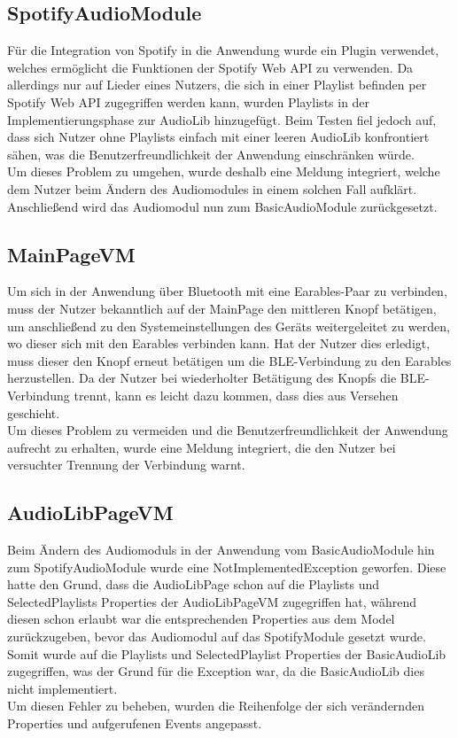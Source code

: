 \documentclass[../validierung.tex]{subfiles}
\begin{document}
	\subsection{SpotifyAudioModule}
		Für die Integration von Spotify in die Anwendung wurde ein Plugin verwendet, welches ermöglicht die Funktionen der Spotify Web API zu verwenden.
		Da allerdings nur auf Lieder eines Nutzers, die sich in einer Playlist befinden per Spotify Web API zugegriffen werden kann, wurden Playlists in
		der Implementierungsphase zur AudioLib hinzugefügt. Beim Testen fiel jedoch auf, dass sich Nutzer ohne Playlists einfach mit einer leeren AudioLib
		konfrontiert sähen, was die Benutzerfreundlichkeit der Anwendung einschränken würde.\\ Um dieses Problem zu umgehen, wurde deshalb eine Meldung
		integriert, welche dem Nutzer beim Ändern des Audiomodules in einem solchen Fall aufklärt. Anschließend wird das Audiomodul nun zum
		BasicAudioModule zurückgesetzt.
	\subsection{MainPageVM}
		Um sich in der Anwendung über Bluetooth mit eine Earables-Paar zu verbinden, muss der Nutzer bekanntlich auf der MainPage den mittleren Knopf
		betätigen, um anschließend zu den Systemeinstellungen des Geräts weitergeleitet zu werden, wo dieser sich mit den Earables verbinden kann. Hat der
		Nutzer dies erledigt, muss dieser den Knopf erneut betätigen um die BLE-Verbindung zu den Earables herzustellen. Da der Nutzer bei wiederholter
		Betätigung des Knopfs die BLE-Verbindung trennt, kann es leicht dazu kommen, dass dies aus Versehen geschieht.\\ Um dieses Problem zu vermeiden
		und die Benutzerfreundlichkeit der Anwendung aufrecht zu erhalten, wurde eine Meldung integriert, die den Nutzer bei versuchter Trennung der
		Verbindung warnt.
	\subsection{AudioLibPageVM}
		Beim Ändern des Audiomoduls in der Anwendung vom BasicAudioModule hin zum SpotifyAudioModule wurde eine NotImplementedException geworfen. Diese
		hatte den Grund, dass die AudioLibPage schon auf die Playlists und SelectedPlaylists Properties der AudioLibPageVM zugegriffen hat, während diesen
		schon erlaubt war die entsprechenden Properties aus dem Model zurückzugeben, bevor das Audiomodul auf das SpotifyModule gesetzt wurde. Somit wurde
		auf die Playlists und SelectedPlaylist Properties der BasicAudioLib zugegriffen, was der Grund für die Exception war, da die BasicAudioLib dies
		nicht implementiert.\\ Um diesen Fehler zu beheben, wurden die Reihenfolge der sich verändernden Properties und aufgerufenen Events angepasst.
\end{document}
